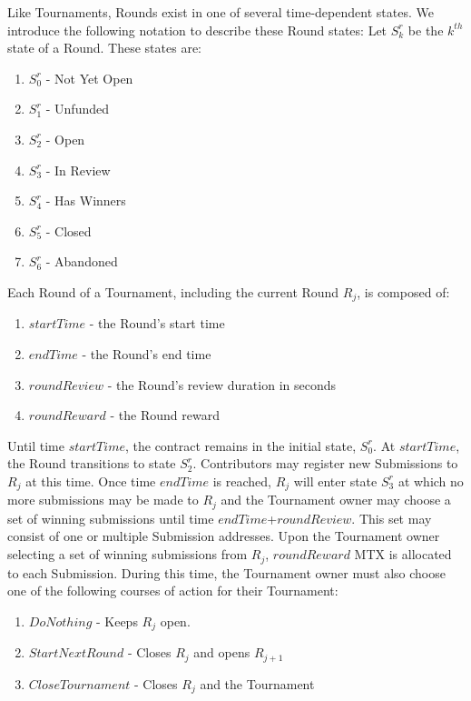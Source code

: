 \documentclass[a4paper, 10pt, conference]{ieeeconf}      %
\begin{document}
Like Tournaments, Rounds exist in one of several time-dependent states. We introduce the following notation to describe these Round states: Let $S_k^r$ be the $k^{th}$ state of a Round. These states are:

\begin{enumerate}
\item $S_{0}^r$ - Not Yet Open
\item $S_{1}^r$ - Unfunded
\item $S_{2}^r$ - Open
\item $S_{3}^r$ - In Review
\item $S_{4}^r$ - Has Winners
\item $S_{5}^r$ - Closed
\item $S_{6}^r$ - Abandoned
\end{enumerate}
\bigskip

Each Round of a Tournament, including the current Round $R_j$, is composed of:

\begin{enumerate}
    \item $startTime$ - the Round's start time
    \item $endTime$ - the Round's end time
    \item $roundReview$ - the Round's review duration in seconds
    \item $roundReward$ - the Round reward
\end{enumerate}
Until time $startTime$, the contract remains in the initial state, $S_{0}^r$. At $startTime$, the Round transitions to state $S_{2}^r$. Contributors may register new Submissions to $R_j$ at this time.
Once time $endTime$ is reached, $R_j$ will enter state $S_{3}^r$ at which no more submissions may be made to $R_j$ and the Tournament owner may choose a set of winning submissions  until time $endTime$+$roundReview$. This set may consist of one or multiple Submission addresses.
Upon the Tournament owner selecting a set of winning submissions from $R_j$, $roundReward$ MTX is allocated to each Submission. During this time, the Tournament owner must also choose one of the following courses of action for their Tournament:
\begin{enumerate}
\item $DoNothing$ - Keeps $R_j$ open. 
\item $StartNextRound$ - Closes $R_j$ and opens $R_{j+1}$
\item $CloseTournament$ - Closes $R_j$ and the Tournament
\end{enumerate}
\end{document}
